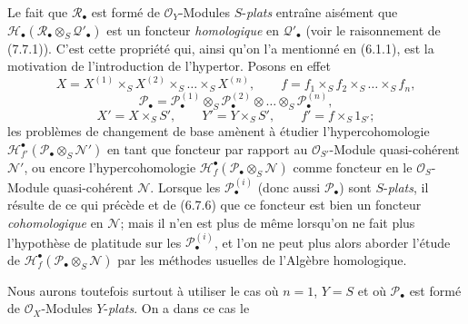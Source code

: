 \begin{scholium}[6.10.4]
Le fait que $\mathscr R_\bullet$ est formé de $\mathscr O_Y$-Modules
$S$-\emph{plats} entraîne aisément que $\mathscr H_\bullet(\mathscr R_\bullet\otimes_S\mathscr Q'_\bullet)$
est un foncteur \emph{homologique} en $\mathscr Q'_\bullet$ (voir le raisonnement de
(7.7.1)). C'est cette propriété qui, ainsi qu'on l'a mentionné en (6.1.1), est
la motivation de l'introduction de l'hypertor. Posons en effet
\[
  X=X^{(1)}\times_SX^{(2)}\times_S\ldots\times_SX^{(n)},
  \qquad
  f=f_1\times_Sf_2\times_S\ldots\times_Sf_n,
\]
\[
  \mathscr P_\bullet
  =
  \mathscr P_\bullet^{(1)}
  \otimes_S\mathscr P_\bullet^{(2)}
  \otimes\ldots\otimes_S\mathscr P_\bullet^{(n)},
\]
\[
  X'=X\times_SS',
  \qquad
  Y'=Y\times_SS',
  \qquad
  f'=f\times_S1_{S'};
\]
les problèmes de changement de base amènent à étudier l'hypercohomologie $\mathscr H^\bullet_{f'}(\mathscr P_\bullet\otimes_S\mathscr N')$
en tant que foncteur par rapport au $\mathscr O_{S'}$-Module quasi-cohérent
$\mathscr N'$, ou encore l'hypercohomologie $\mathscr H^\bullet_f(\mathscr P_\bullet\otimes_S\mathscr N)$
comme foncteur en le $\mathscr O_S$-Module quasi-cohérent $\mathscr N$. Lorsque
les $\mathscr P_\bullet^{(i)}$ (donc aussi $\mathscr P_\bullet$) sont
$S$-\emph{plats}, il résulte de ce qui précède et de (6.7.6) que ce foncteur est bien
un foncteur \emph{cohomologique} en $\mathscr N$; mais il n'en est plus de même
lorsqu'on ne fait plus l'hypothèse de platitude sur les
$\mathscr P_\bullet^{(i)}$, et l'on ne peut plus alors aborder l'étude de $\mathscr H^\bullet_f(\mathscr P_\bullet\otimes_S\mathscr N)$
par les méthodes usuelles de l'Algèbre homologique.

Nous aurons toutefois surtout à utiliser le cas où $n=1$, $Y=S$ et où
$\mathscr P_\bullet$ est formé de $\mathscr O_X$-Modules $Y$-\emph{plats}. On a dans
ce cas le
\end{scholium}

